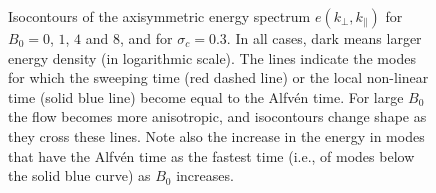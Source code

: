 \documentclass[aip,pop,reprint,amsmath,amssymb,floatfix]{revtex4-1}
\begin{document}
\begin{figure}
  \centering
  \caption{Isocontours of the axisymmetric energy spectrum
    $e(k_\perp,k_\parallel)$ for $B_0=0$, $1$, $4$ and $8$, and for
    $\sigma_c = 0.3$. In all cases, dark means larger energy density (in
    logarithmic scale). The lines indicate the modes for which the
    sweeping time (red dashed line) or the local non-linear time
    (solid blue line) become equal to the Alfv\'en time. For large
    $B_0$ the flow becomes more anisotropic, and isocontours change
    shape as they cross these lines. Note also the increase in the
    energy in modes that have the Alfv\'en time as the fastest time
    (i.e., of modes below the solid blue curve) as $B_0$ increases.}
  \label{fig2:isocontourns}
\end{figure}
\end{document}
